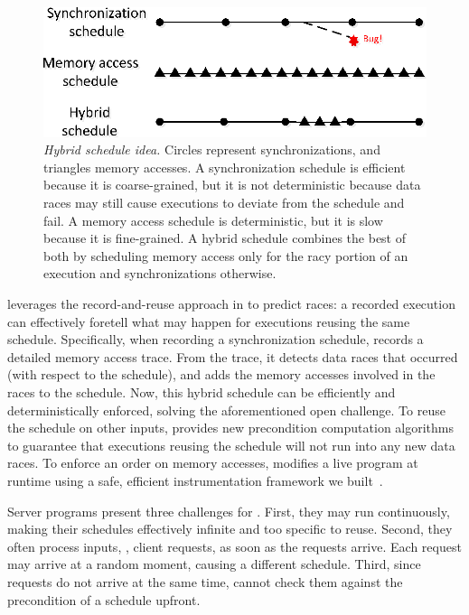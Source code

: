 \begin{figure}[t]
\includegraphics[width=0.7\linewidth]{peregrine/figures/hybrid-schedule}
\caption{{\em Hybrid schedule idea.} Circles represent synchronizations,
  and triangles memory accesses.  A synchronization schedule is efficient
  because it is coarse-grained, but it is not deterministic because data
  races may still cause executions to deviate from the schedule and
  fail.  A memory access schedule is
  deterministic, but it is slow because it is fine-grained.  A hybrid
  schedule combines the best of both by scheduling memory access only for
  the racy portion of an execution and synchronizations
  otherwise.} \label{fig:hybrid-schedule}
\end{figure}


\peregrine leverages the record-and-reuse approach in \tern to predict races:
a recorded execution can effectively foretell what may happen for
executions reusing the same schedule.  Specifically, when recording a
synchronization schedule, \peregrine records a detailed memory access trace.
From the trace, it detects data races that occurred (with respect to the
schedule), and adds the memory accesses involved in the races to the
schedule.  Now, this hybrid schedule can be efficiently and
deterministically enforced, solving the aforementioned open challenge.
To reuse the schedule on other inputs, \peregrine provides new precondition
computation algorithms to guarantee that executions reusing the schedule
will not run into any new data races. To enforce an order on memory
accesses, \peregrine modifies a live program at runtime using
a safe, efficient instrumentation framework we built~\cite{wu:loom:osdi10}.

Server programs present three challenges for \smt. First, they may run
continuously, making their schedules effectively infinite and too specific
to reuse.  Second, they often process inputs, \ie, client requests, as
soon as the requests arrive. Each request may arrive at a random moment,
causing a different schedule. Third, since requests do not arrive at the
same time, \peregrine cannot check them against the precondition of a
schedule upfront.

